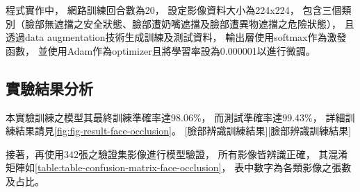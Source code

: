 \documentclass[class=NCU_thesis, crop=false]{standalone}
\begin{document}
程式實作中，
網路訓練回合數為20，
設定影像資料大小為224x224，
包含三個類別（臉部無遮擋之安全狀態、臉部遭奶嘴遮擋及臉部遭異物遮擋之危險狀態），
且透過data augmentation技術生成訓練及測試資料，
輸出層使用softmax作為激發函數，
並使用Adam作為optimizer且將學習率設為0.000001以進行微調。

\subsection{實驗結果分析}
本實驗訓練之模型其最終訓練準確率達98.06\%，
而測試準確率達99.43\%，
詳細訓練結果請見\cref{fig:fig-result-face-occlusion}。
[臉部辨識訓練結果][臉部辨識訓練結果]

接著，再使用342張之驗證集影像進行模型驗證，
所有影像皆辨識正確，
其混淆矩陣如\cref{table:table-confusion-matrix-face-occlusion}，
表中數字為各類影像之張數及占比。
\end{document}
